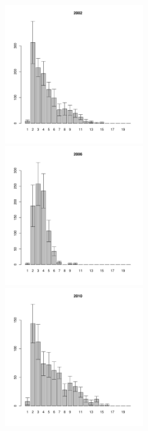 \documentclass[12pt, a4paper]{article}
\begin{document}
\begin{figure}[h]


\begin{multicols}{3}
\hfill
\includegraphics[width=60mm]{../White_Sea/Ryashkov_YuG/YuG_2002_.pdf}
\hfill
\includegraphics[width=60mm]{../White_Sea/Ryashkov_YuG/YuG_2006_.pdf}
\hfill
\includegraphics[width=60mm]{../White_Sea/Ryashkov_YuG/YuG_2010_.pdf}
\end{multicols}



\end{figure}
\end{document}
